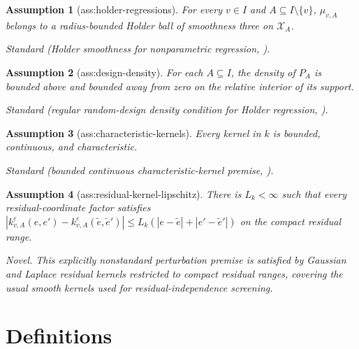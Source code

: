 \documentclass{article}
\newtheorem{assumption}{Assumption}
\begin{document}
\begin{assumption}[ass:holder-regressions]\label{ass:holder-regressions}
For every \(v\in I\) and \(A\subseteq I\setminus\{v\}\), \(\mu_{v,A}\) belongs to a radius-bounded Holder ball of smoothness three on \(\mathcal X_A\).
\par\smallskip\noindent\emph{Standard} (Holder smoothness for nonparametric regression, \cite{stone1982optimal}).
\end{assumption}

\begin{assumption}[ass:design-density]\label{ass:design-density}
For each \(A\subseteq I\), the density of \(P_A\) is bounded above and bounded away from zero on the relative interior of its support.
\par\smallskip\noindent\emph{Standard} (regular random-design density condition for Holder regression, \cite{stone1982optimal}).
\end{assumption}

\begin{assumption}[ass:characteristic-kernels]\label{ass:characteristic-kernels}
Every kernel in \(k\) is bounded, continuous, and characteristic.
\par\smallskip\noindent\emph{Standard} (bounded continuous characteristic-kernel premise, \cite{pfister2018dhsic}).
\end{assumption}

\begin{assumption}[ass:residual-kernel-lipschitz]\label{ass:residual-kernel-lipschitz}
There is \(L_k<\infty\) such that every residual-coordinate factor satisfies \(|k^{\varepsilon}_{v,A}(e,e')-k^{\varepsilon}_{v,A}(\tilde e,\tilde e')|\le L_k(|e-\tilde e|+|e'-\tilde e'|)\) on the compact residual range.
\par\smallskip\noindent\emph{Novel.} This explicitly nonstandard perturbation premise is satisfied by Gaussian and Laplace residual kernels restricted to compact residual ranges, covering the usual smooth kernels used for residual-independence screening.
\end{assumption}

\section{Definitions}
\end{document}
